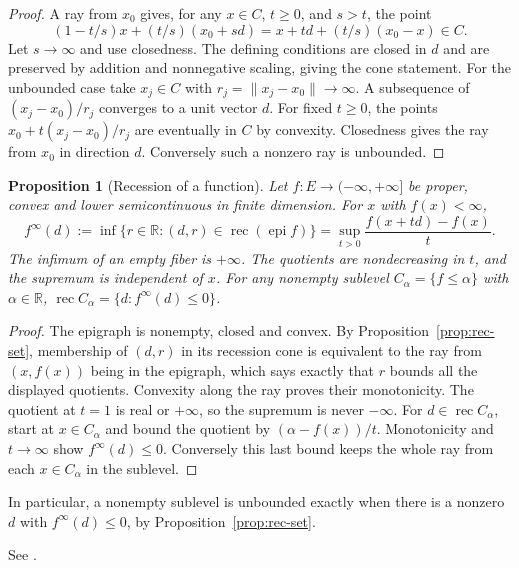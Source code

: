 \documentclass[11pt,oneside,openany]{book}
\theoremstyle{plain}
\newtheorem{proposition}[theorem]{Proposition}
\theoremstyle{definition}
\theoremstyle{remark}
\begin{document}
\begin{proof}
A ray from \(x_0\) gives, for any \(x\in C\), \(t\ge0\),
and \(s>t\), the point
\[
  (1-t/s)x+(t/s)(x_0+sd)=x+td+(t/s)(x_0-x)\in C.
\]
Let \(s\to\infty\) and use closedness. The defining conditions
are closed in \(d\) and are preserved by addition and nonnegative
scaling, giving the cone statement. For the unbounded case take
\(x_j\in C\) with \(r_j=\lVert x_j-x_0\rVert\to\infty\).
A subsequence of \((x_j-x_0)/r_j\) converges to a unit vector \(d\).
For fixed \(t\ge0\), the points \(x_0+t(x_j-x_0)/r_j\)
are eventually in \(C\) by convexity. Closedness gives the ray
from \(x_0\) in direction \(d\). Conversely such a nonzero ray
is unbounded.
\end{proof}

\begin{proposition}[Recession of a function]\label{prop:rec-function}
Let \(f:E\to(-\infty,+\infty]\) be proper, convex and lower
semicontinuous in finite dimension. For \(x\) with \(f(x)<\infty\),
\[
 f^\infty(d)
  :=\inf\{r\in\mathbb R:(d,r)\in\operatorname{rec}(\operatorname{epi} f)\}
  =\sup_{t>0}\frac{f(x+td)-f(x)}{t}.
\]
The infimum of an empty fiber is \(+\infty\). The quotients are
nondecreasing in \(t\), and the supremum is independent of \(x\).
For any nonempty sublevel \(C_\alpha=\{f\le\alpha\}\) with
\(\alpha\in\mathbb R\),
\(\operatorname{rec}C_\alpha=\{d:f^\infty(d)\le0\}\).
\end{proposition}

\begin{proof}
The epigraph is nonempty, closed and convex. By
Proposition~\ref{prop:rec-set}, membership of \((d,r)\) in
its recession cone is equivalent to the ray from
\((x,f(x))\) being in the epigraph, which says exactly that
\(r\) bounds all the displayed quotients. Convexity along
the ray proves their monotonicity. The quotient at \(t=1\)
is real or \(+\infty\), so the supremum is never \(-\infty\).
For \(d\in\operatorname{rec}C_\alpha\), start at \(x\in C_\alpha\)
and bound the quotient by \((\alpha-f(x))/t\). Monotonicity
and \(t\to\infty\) show \(f^\infty(d)\le0\).
Conversely this last bound keeps the whole ray from each
\(x\in C_\alpha\) in the sublevel.
\end{proof}

In particular, a nonempty sublevel is unbounded exactly when
there is a nonzero \(d\) with \(f^\infty(d)\le0\), by
Proposition~\ref{prop:rec-set}.

See \cite[\S8, in particular Theorem 8.5]{Rockafellar}.
\end{document}
